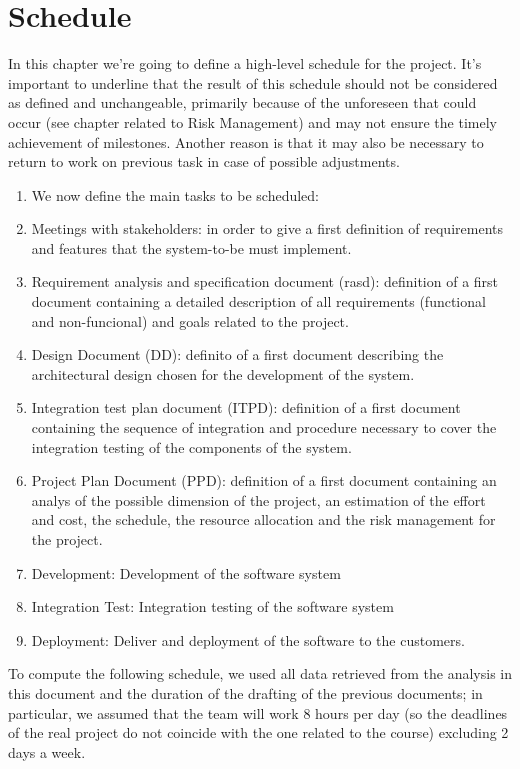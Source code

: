\documentclass[10pt, a4paper,titlepage]{article}
\begin{document}
\section{Schedule}
In this chapter we’re going to define a high-level schedule for the project.
It’s important to underline that the result of this schedule should not be considered as defined and unchangeable, primarily because of the unforeseen that could occur (see chapter related to Risk Management) and may not ensure the timely achievement of milestones. Another reason is that it may also be necessary to return to work on previous task in case of possible adjustments.
\begin{enumerate}
\item We now define the main tasks to be scheduled:
\item Meetings with stakeholders: in order to give a first definition of requirements and features that the system-to-be must implement.
\item Requirement analysis and specification document (rasd): definition of a first document containing a detailed description of all requirements (functional and non-funcional) and goals related to the project.
\item Design Document (DD): definito of a first document describing the architectural design chosen for the development of the system.
\item Integration test plan document (ITPD): definition of a first document containing the sequence of integration and procedure necessary to cover the integration testing of the components of the system.
\item Project Plan Document (PPD): definition of a first document containing an analys of the possible dimension of the project, an estimation of the effort and cost, the schedule, the resource allocation and the risk management for the project.
\item Development: Development of the software system
\item Integration Test: Integration testing of the software system
\item Deployment: Deliver and deployment of the software to the customers.
\end{enumerate}
To compute the following schedule, we used all data retrieved from the analysis in this document and the duration of the drafting of the previous documents; in particular, we assumed that the team will work 8 hours per day (so the deadlines of the real project do not coincide with the one related to the course) excluding 2 days a week.
\end{document}
